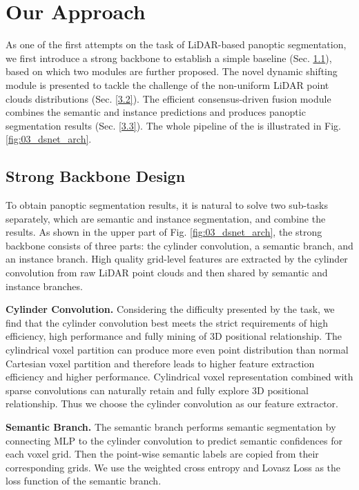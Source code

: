 \documentclass[final]{cvpr}
\begin{document}
 
\section{Our Approach}
As one of the first attempts on the task of LiDAR-based panoptic segmentation, we first introduce a strong backbone
to establish a simple baseline (Sec. \ref{3.1}), based on which two modules are further proposed.
The novel dynamic shifting module is presented to tackle the challenge of the non-uniform LiDAR point clouds distributions (Sec. \ref{3.2}).
The efficient consensus-driven fusion module combines the semantic and instance predictions and produces panoptic segmentation results (Sec. \ref{3.3}).
The whole pipeline of the \nickname{} is illustrated in Fig. \ref{fig:03_dsnet_arch}.


\subsection{Strong Backbone Design}\label{3.1}



To obtain panoptic segmentation results, it is natural to solve two sub-tasks separately, which are semantic and instance segmentation, and combine the
results.
As shown in the upper part of Fig. \ref{fig:03_dsnet_arch}, the strong backbone consists of three parts:
the cylinder convolution, a semantic branch, and an instance branch.
High quality grid-level features are extracted by the cylinder
convolution from raw LiDAR point clouds and then shared by semantic and instance branches.


\noindent\textbf{Cylinder Convolution.}
Considering the difficulty presented by the task, we find that the cylinder convolution \cite{zhou2020cylinder3d} best
meets the strict requirements of high efficiency, high performance and fully mining of 3D positional relationship.
The cylindrical voxel partition can produce more even point distribution than normal Cartesian voxel
partition and therefore leads to higher feature extraction efficiency and higher performance.
Cylindrical voxel representation combined with sparse convolutions can naturally retain and fully explore
3D positional relationship.
Thus we choose the cylinder convolution as our feature extractor.



\noindent\textbf{Semantic Branch.}
The semantic branch performs semantic segmentation by connecting MLP to the cylinder convolution to predict semantic confidences for each voxel grid.
Then the point-wise semantic labels are copied from their corresponding grids.
We use the weighted cross entropy and Lovasz Loss \cite{berman2018lovasz} as the loss function of the semantic branch.
\end{document}
